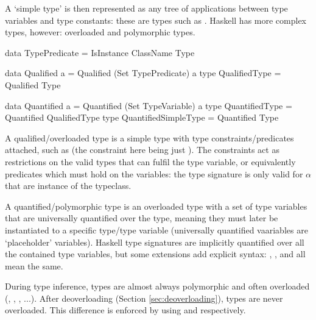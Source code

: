 \documentclass[dissertation.tex]{subfiles}
\begin{document}
{    A `simple type' is then represented as any tree of applications between type variables and type constants: these are
    types such as . Haskell has more complex types, however: overloaded and polymorphic
    types.

    \begin{haskellfigure}
    data TypePredicate = IsInstance ClassName Type

    data Qualified a = Qualified (Set TypePredicate) a
    type QualifiedType = Qualified Type

    data Quantified a = Quantified (Set TypeVariable) a
    type QuantifiedType = Quantified QualifiedType
    type QuantifiedSimpleType = Quantified Type
    \end{haskellfigure}

    A qualified/overloaded type is a simple type with type constraints/predicates attached, such as  (the constraint here being just ). The constraints act as restrictions on the valid types that can fulfil the type variable, or
    equivalently predicates which must hold on the variables: the type signature is only valid for \(\alpha\) that are
    instance of the  typeclass.
    
    A quantified/polymorphic type is an overloaded type with a set of type variables that are universally quantified
    over the type, meaning they must later be instantiated to a specific type/type variable (universally quantified
    vaariables are `placeholder' variables). Haskell type signatures are implicitly quantified over all the contained
    type variables, but some extensions add explicit syntax: , , and  all mean the same.

    During type inference, types are almost always polymorphic and often overloaded (, , , ...). After deoverloading (Section \ref{sec:deoverloading}), types are never overloaded. This
    difference is enforced by using  and  respectively.

}
\end{document}
